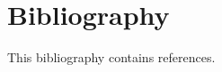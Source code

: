 \documentclass[12pt,openany]{cmuthesis}
\begin{document}
\begin{acknowledgments}
 
\end{acknowledgments}

\pagestyle{plain}

\tableofcontents
{}
\listoffigures
{}

\raggedbottom
\mainmatter













\chapter*{Bibliography}

\vspace{-25mm}
This bibliography contains  references.
\vspace{10mm}

\printbibliography[heading=none]
\end{document}
